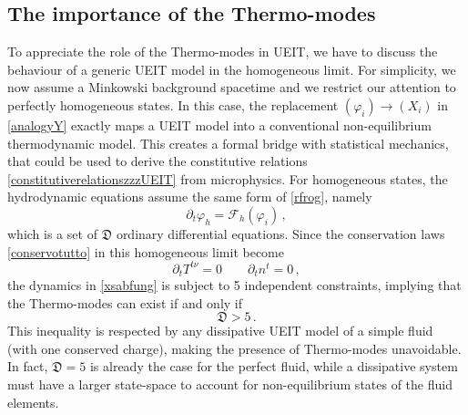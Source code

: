 \documentclass[a4paper, amsfonts, amssymb, amsmath, reprint, twocolumn, showkeys, nofootinbib]{revtex4-2}
\begin{document}
\subsection{The importance of the Thermo-modes}

To appreciate the role of the Thermo-modes in UEIT, we have to discuss the behaviour of a generic UEIT model in the homogeneous limit. For simplicity, we now assume a Minkowski background spacetime and we restrict our attention to perfectly homogeneous states. In this case, the replacement
$(\varphi_i) \longrightarrow (X_i)$ in \eqref{analogyY}
exactly maps a UEIT model into a conventional non-equilibrium thermodynamic model. 
This creates a formal bridge with statistical mechanics, that could be used to derive the constitutive relations \eqref{constitutiverelationszzzUEIT} from microphysics.
For homogeneous states, the hydrodynamic equations assume the same form of \eqref{rfrog}, namely
\begin{equation}\label{xsabfung}
\partial_t \varphi_h = \mathcal{F}_h (\varphi_i) \, ,
\end{equation}
which is a set of $\mathfrak{D}$ ordinary differential equations. 
%
%
Since the conservation laws \eqref{conservotutto} in this homogeneous limit become
\begin{equation}
\partial_t T^{t\nu} =0   \quad \quad   \partial_t n^t =0 \, ,
\end{equation} 
the dynamics in \eqref{xsabfung} is subject to 5 independent constraints, implying that the Thermo-modes can exist if and only if
\begin{equation}\label{DEGOF}
\mathfrak{D} >5 \, .
\end{equation}
This inequality is respected by any dissipative UEIT model of a simple fluid (with one conserved charge), making the presence of Thermo-modes unavoidable.  In fact, $\mathfrak{D}=5$ is already the case for the perfect fluid, while a dissipative system must have a larger state-space to account for non-equilibrium states of the fluid elements.  
\end{document}
